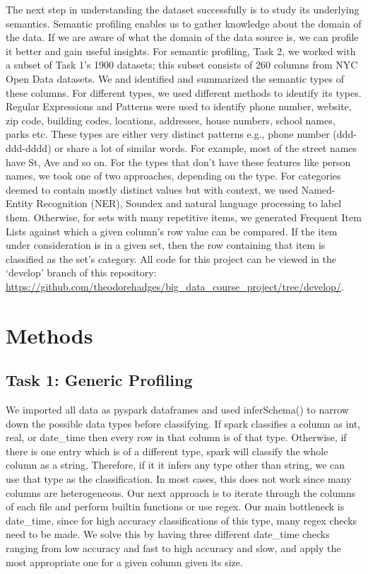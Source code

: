\documentclass[sigconf,authordraft]{acmart}
\begin{document}
The next step in understanding the dataset successfully is to study its underlying semantics. Semantic profiling enables us to gather knowledge
about the domain of
the data. If we are aware of what the domain of the data source is, we can 
profile it better and gain useful insights. For semantic profiling, Task 2,
we worked with a subset of Task 1's 1900 datasets; this subset consists of 260 columns from NYC Open Data datasets. We and identified and summarized the semantic types of these columns. For
different types, we used different methods to identify its types.
Regular Expressions and Patterns were used to identify phone number, website,
zip code, building
codes, locations, addresses, house numbers, school names, parks etc. These 
types are either very
distinct patterns e.g., phone number (ddd-ddd-dddd) or share a lot of similar
words. For example, most of the
street names have St, Ave and so on. For the types that don’t have these 
features like person names,
we took one of two approaches, depending on the type. For categories deemed
to contain mostly
distinct values but with context, we used Named-Entity Recognition (NER), 
Soundex and
natural language processing to label them. Otherwise, for sets with many 
repetitive items, we
generated Frequent Item Lists against which a given column’s row value can 
be compared. If the
item under consideration is in a given set, then the row containing that 
item is classified as the
set’s category. All code for this project can be viewed in the `develop' 
branch of this repository:
\url{https://github.com/theodorehadges/big_data_course_project/tree/develop/}.


\section{Methods}
\subsection{Task 1: Generic Profiling}

We imported all data as pyspark dataframes and used inferSchema() to narrow down the possible data types before classifying. If spark classifies a column as int, real, or date\_time then every row in that column is of that type. Otherwise, if there is one entry which is of a different type, spark will classify the whole column as a string. Therefore, if it it infers any type other than string, we can use that type as the classification. In most cases, this does not work since many columns are heterogeneous. Our next approach is to iterate through the columns of each file and perform builtin functions or use regex. Our main bottleneck is date\_time, since for high accuracy classifications of this type, many regex checks need to be made. We solve this by having three different date\_time checks ranging from low accuracy and fast to high accuracy and slow, and apply the most appropriate one for a given column given its size.
\end{document}
